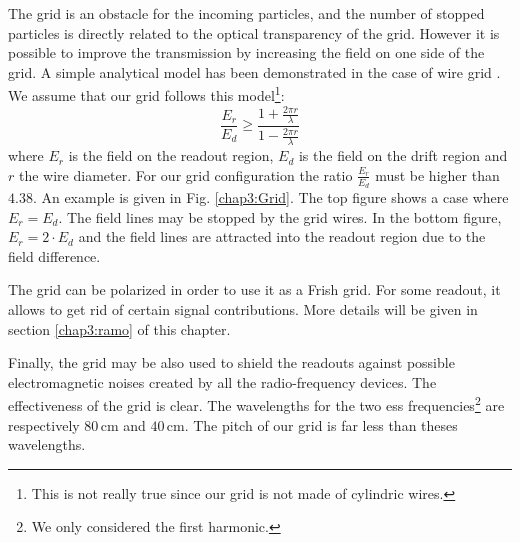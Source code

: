 \begin{refsection}
  The grid is an obstacle for the incoming particles, and the number of stopped particles is directly related to the optical transparency of the grid. However it is possible to improve the transmission by increasing the field on one side of the grid. A simple analytical model has been demonstrated in the case of wire grid \cite{Bunemann1949}. We assume that our grid follows this model\footnote{This is not really true since our grid is not made of cylindric wires.}:
  \begin{equation}
    \frac{E_{r}}{E_{d}} \geq \frac{1+\frac{2 \pi r}{\lambda}}{1-\frac{2 \pi r}{\lambda}}
  \end{equation}
  where $E_{r}$ is the field on the readout region, $E_{d}$ is the field on the drift region and $r$ the wire diameter. For our grid configuration the ratio $\frac{E_{r}}{E_{d}}$ must be higher than $4.38$.
  An example is given in Fig. \ref{chap3:Grid}. The top figure shows a case where $E_{r}=E_{d}$. The field lines may be stopped by the grid wires. In the bottom figure, $E_{r}=2 \cdot E_{d}$ and the field lines are attracted into the readout region due to the field difference.

  The grid can be polarized in order to use it as a Frish grid. For some readout, it allows to get rid of certain signal contributions. More details will be given in section \ref{chap3:ramo} of this chapter.

  Finally, the grid may be also used to shield the readouts against possible electromagnetic noises created by all the radio-frequency devices. The effectiveness of the grid is clear. The wavelengths for the two \acrshort{ess} frequencies\footnote{We only considered the first harmonic.} are respectively $80\,\mathrm{cm}$ and $40\,\mathrm{cm}$. The pitch of our grid is far less than theses wavelengths.



\end{refsection}
